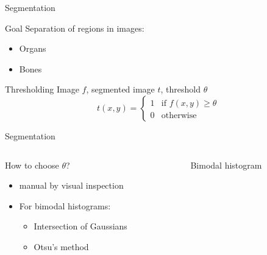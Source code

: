 \begin{frame}[c]{Segmentation}
    \begin{block}{Goal}
        Separation of regions in images:
        \begin{itemize}
            \item Organs
            \item Bones
        \end{itemize}
    \end{block}
    \begin{block}{Thresholding}
        Image $f$, segmented image $t$, threshold $\theta$
        \begin{equation*}
            t(x,y) =
            \begin{cases}
                1 & \mbox{if } f(x,y)\geq \theta \\
                0 & \mbox{otherwise}
            \end{cases}
        \end{equation*}
    \end{block}
\end{frame}

\begin{frame}[c]{Segmentation}
    \begin{columns}[onlytextwidth,T]
        \begin{column}{0.475\textwidth}
            \begin{block}{How to choose $\theta$?}
                \begin{itemize}
                    \item manual by visual inspection
                    \item For bimodal histograms:
                          \begin{itemize}
                              \item Intersection of Gaussians
                              \item Otsu's method
                          \end{itemize}
                \end{itemize}
            \end{block}
        \end{column}
        \begin{column}{0.475\textwidth}
            \centering
            Bimodal histogram
        \end{column}
    \end{columns}
\end{frame}

